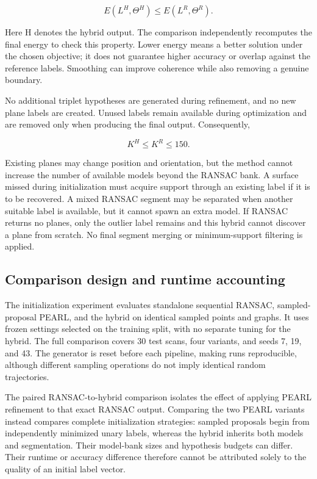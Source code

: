 \begin{equation}
E(L^H,\Theta^H)\leq E(L^R,\Theta^R).
\label{eq:54}
\end{equation}

Here H denotes the hybrid output. The comparison independently recomputes the final energy to check this property. Lower energy means a better solution under the chosen objective; it does not guarantee higher accuracy or overlap against the reference labels. Smoothing can improve coherence while also removing a genuine boundary.

No additional triplet hypotheses are generated during refinement, and no new plane labels are created. Unused labels remain available during optimization and are removed only when producing the final output. Consequently,

\begin{equation}
K^H\leq K^R\leq150.
\label{eq:55}
\end{equation}

Existing planes may change position and orientation, but the method cannot increase the number of available models beyond the RANSAC bank. A surface missed during initialization must acquire support through an existing label if it is to be recovered. A mixed RANSAC segment may be separated when another suitable label is available, but it cannot spawn an extra model. If RANSAC returns no planes, only the outlier label remains and this hybrid cannot discover a plane from scratch. No final segment merging or minimum-support filtering is applied.

\subsection{Comparison design and runtime accounting}\label{comparison-design-and-runtime-accounting}

The initialization experiment evaluates standalone sequential RANSAC, sampled-proposal PEARL, and the hybrid on identical sampled points and graphs. It uses frozen settings selected on the training split, with no separate tuning for the hybrid. The full comparison covers 30 test scans, four variants, and seeds 7, 19, and 43. The generator is reset before each pipeline, making runs reproducible, although different sampling operations do not imply identical random trajectories.

The paired RANSAC-to-hybrid comparison isolates the effect of applying PEARL refinement to that exact RANSAC output. Comparing the two PEARL variants instead compares complete initialization strategies: sampled proposals begin from independently minimized unary labels, whereas the hybrid inherits both models and segmentation. Their model-bank sizes and hypothesis budgets can differ. Their runtime or accuracy difference therefore cannot be attributed solely to the quality of an initial label vector.

